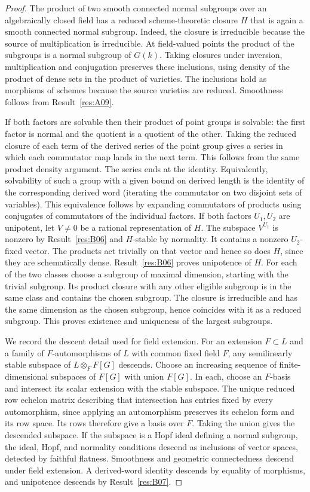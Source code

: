 \documentclass[11pt,a4paper,openany,oneside]{book}
\theoremstyle{resultstyle}
\theoremstyle{definition}
\numberwithin{equation}{chapter}
\begin{document}
\begin{proof}
The product of two smooth connected normal subgroups over an
algebraically closed field has a reduced scheme-theoretic closure \(H\)
that is again a smooth connected normal subgroup. Indeed, the
closure is irreducible because the source of multiplication is
irreducible. At field-valued points the product of the subgroups is
a normal subgroup of \(G(k)\). Taking closures under inversion,
multiplication and conjugation preserves these inclusions, using
density of the product of dense sets in the product of varieties.
The inclusions hold as morphisms of schemes because the source
varieties are reduced. Smoothness follows from
Result~\ref{res:A09}.

If both factors are solvable then their product of point groups is
solvable: the first factor is normal and the quotient is a quotient
of the other. Taking the reduced closure of each term of the
derived series of the point group gives a series in which each
commutator map lands in the next term. This follows from the same
product density argument. The series ends at the identity.
Equivalently, solvability of such a group with a given bound on
derived length is the identity of the corresponding derived word
(iterating the commutator on two disjoint sets of variables).
This equivalence follows by expanding commutators of products
using conjugates of commutators of the individual factors.
If both factors \(U_1,U_2\) are unipotent, let \(V\ne0\) be a
rational representation of \(H\). The subspace \(V^{U_1}\) is
nonzero by Result~\ref{res:B06} and \(H\)-stable by normality.
It contains a nonzero \(U_2\)-fixed vector. The products act
trivially on that vector and hence so does \(H\), since they
are schematically dense. Result~\ref{res:B06} proves unipotence
of \(H\). For each of the two classes choose a subgroup of
maximal dimension, starting with the trivial subgroup. Its product
closure with any other eligible subgroup is in the same class and
contains the chosen subgroup. The closure is irreducible and has
the same dimension as the chosen subgroup, hence coincides with it
as a reduced subgroup. This proves existence and uniqueness of the
largest subgroups.

We record the descent detail used for field extension. For an
extension \(F\subset L\) and a family of \(F\)-automorphisms of
\(L\) with common fixed field \(F\), any semilinearly stable subspace
of \(L\otimes_F F[G]\) descends. Choose an increasing sequence of
finite-dimensional subspaces of \(F[G]\) with union \(F[G]\).
In each, choose an \(F\)-basis and intersect its scalar extension
with the stable subspace. The unique reduced row echelon matrix
describing that intersection has entries fixed by every
automorphism, since applying an automorphism preserves its echelon
form and its row space. Its rows therefore give a basis over \(F\).
Taking the union gives the descended subspace. If the subspace is a
Hopf ideal defining a normal subgroup, the ideal, Hopf, and
normality conditions descend as inclusions of vector spaces,
detected by faithful flatness. Smoothness and geometric
connectedness descend under field extension. A derived-word identity
descends by equality of morphisms, and unipotence descends by
Result~\ref{res:B07}.


\end{proof}
\end{document}
